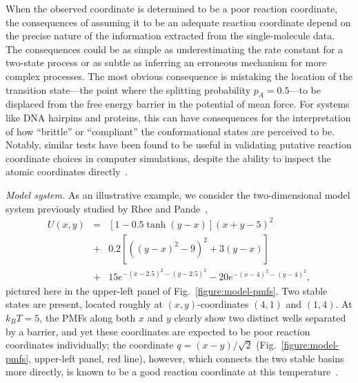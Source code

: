 \documentclass[aps,prl,twocolumn,superscriptaddress,floatfix]{revtex4-1}
\begin{document}
When the observed coordinate is determined to be a poor reaction coordinate, the consequences of assuming it to be an adequate reaction coordinate depend on the precise nature of the information extracted from the single-molecule data.
The consequences could be as simple as underestimating the rate constant for a two-state process or as subtle as inferring an erroneous mechanism for more complex processes.
The most obvious consequence is mistaking the location of the transition state---the point where the splitting probability $p_A = 0.5$---to be displaced from the free energy barrier in the potential of mean force.
For systems like DNA hairpins and proteins, this can have consequences for the interpretation of how ``brittle'' or ``compliant'' the conformational states are perceived to be.
Notably, similar tests have been found to be useful in validating putative reaction coordinate choices in computer simulations, despite the ability to inspect the atomic coordinates directly~\cite{peters:jcp:2007:reaction-coordinate-test,bolhuis:jcp:2010:reaction-coordinate-test}.


\noindent\emph{Model system.}
As an illustrative example, we consider the two-dimensional model system previously studied by Rhee and Pande~\cite{rhee:jpcb:2005:splitting-probability},
\begin{eqnarray}
U(x,y) &=& [1 - 0.5 \tanh (y-x)] (x+y-5)^2 \\
&+& 0.2[((y-x)^2-9)^2+3(y-x)] \nonumber \\
&+& 15 e^{-(x-2.5)^2-(y-2.5)^2} - 20 e^{-(x-4)^2-(y-4)^2} \nonumber ,
\end{eqnarray}
pictured here in the upper-left panel of Fig.~\ref{figure:model-pmfs}.
Two stable states are present, located roughly at $(x,y)$-coordinates $(4,1)$ and $(1,4)$.
At $k_B T = 5$, the PMFs along both $x$ and $y$ clearly show two distinct wells separated by a barrier, and yet these coordinates are expected to be poor reaction coordinates individually; the coordinate $q = (x-y)/\sqrt{2}$ (Fig.~\ref{figure:model-pmfs}, upper-left panel, red line), however, which connects the two stable basins more directly, is known to be a good reaction coordinate at this temperature~\cite{rhee:jpcb:2005:splitting-probability}.
\end{document}
